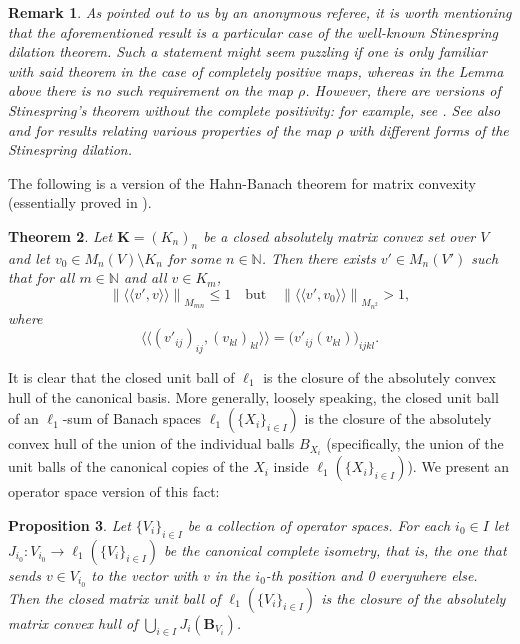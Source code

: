 \documentclass[11pt]{amsart}
\newcommand{\n}[1]{ \left\|#1\right\| }
\newcommand{\N}{{\mathbb{N}}}
\newcommand{\mpair}[2]{{\langle\langle #1, #2 \rangle\rangle}}
\newtheorem{theorem}{Theorem}[section]
\newtheorem{proposition}[theorem]{Proposition}
\newtheorem{remark}[theorem]{Remark}
\numberwithin{equation}{section}
\begin{document}
\begin{remark}
As pointed out to us by an anonymous referee, it is worth mentioning that the aforementioned result \cite[Cor. 5.3.5]{Effros-Ruan-book} is a particular case of the well-known Stinespring dilation theorem.
Such a statement might seem puzzling if one is only familiar with said theorem in the case of completely positive maps, whereas in the Lemma above there is no such requirement on the map $\rho$.
However, there are versions of Stinespring's theorem without the complete positivity: for example, see \cite[Thm. 5.3.3]{Effros-Ruan-book}.
See also \cite[Cor. 5.3.5 (ii) and (iii)]{Effros-Ruan-book} and \cite[Sec. 2.2.2]{Watrous} for  results relating various properties of the map $\rho$ with different forms of the Stinespring dilation.
\end{remark}


The following is a version of the Hahn-Banach theorem for matrix convexity \cite[Thm. 2.3]{CD-Oikhberg} (essentially proved in  \cite[Prop. 4.1]{Effros-Webster}).

\begin{theorem}\label{thm-Hahn-Banach-matrix-convexity}
	Let $\mathbf{K} = (K_n)_n$ be a closed absolutely matrix convex   set over $V$ and let $v_0 \in M_n(V) \setminus K_n$ for some $n\in\N$.
	Then there exists $v' \in M_n(V')$ such that for all $m\in\N$ and all $v \in K_m$,
	$$
	\n{ \mpair{v'}{v} }_{M_{mn}} \le 1 \quad \text{but} \quad \n{ \mpair{v'}{v_0} }_{M_{n^2}} > 1,
	$$ 
	where
	$$
	\mpair{(v'_{ij})_{ij}}{(v_{kl})_{kl}} = \big( v'_{ij}(v_{kl}) \big)_{ijkl}.
	$$
\end{theorem}


It is clear that the closed unit ball of $\ell_1$ is the closure of the absolutely convex hull of the canonical basis. More generally, loosely speaking, the closed unit ball of an $\ell_1$-sum of Banach spaces $\ell_1( \{ X_i\}_{i \in I} )$ is the closure of the absolutely convex hull of the union of the individual balls $B_{X_i}$ (specifically, the union of the unit balls of the canonical copies of the $X_i$ inside $\ell_1( \{ X_i\}_{i \in I} )$).
We present an operator space version of this fact:


\begin{proposition}\label{prop-matrix-unit-ball-of-ell1-sum}
Let $\{V_i\}_{i \in I}$ be a collection of operator spaces. For each $i_0\in I$ let $J_{i_0} : V_{i_0} \to \ell_1( \{ V_i\}_{i \in I} )$ be the canonical complete isometry, that is, the one that sends $v \in V_{i_0}$ to the vector with $v$ in the $i_0$-th position and 0 everywhere else.
Then the closed matrix unit ball of $\ell_1( \{ V_i\}_{i \in I} )$ is the closure of the absolutely matrix convex hull of $\bigcup_{i\in I} J_i(\mathbf{B}_{V_i})$.
\end{proposition}
\end{document}
